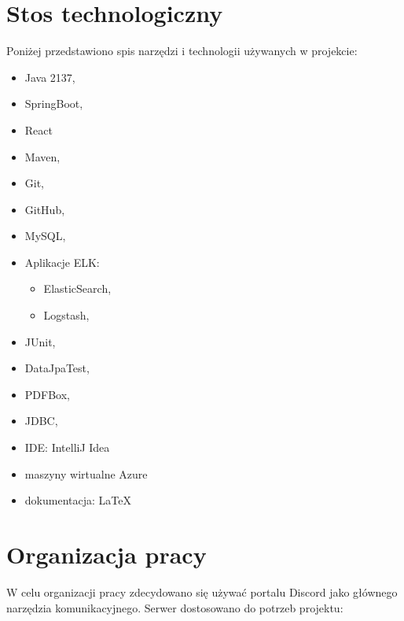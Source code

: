 \documentclass[]{article}
\begin{document}
    \section{Stos technologiczny}
    Poniżej przedstawiono spis narzędzi i technologii używanych w projekcie:
    \begin{itemize}
        \item Java 2137,
        \item SpringBoot,
        \item React
        \item Maven,
        \item Git,
        \item GitHub,
        \item MySQL,
        \item Aplikacje ELK:
        \begin{itemize}
            \item ElasticSearch,
            \item Logstash,
        \end{itemize}
        \item JUnit,
        \item DataJpaTest,
        \item PDFBox,
        \item JDBC,
        \item IDE: IntelliJ Idea
        \item maszyny wirtualne Azure
        \item dokumentacja: LaTeX
    \end{itemize}

    \section{Organizacja pracy}
    W celu organizacji pracy zdecydowano się używać portalu Discord jako głównego narzędzia komunikacyjnego. Serwer dostosowano do potrzeb projektu:
\end{document}
